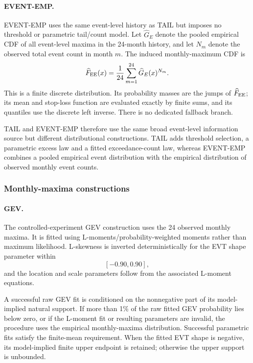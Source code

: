\documentclass[AMA,Times1COL]{WileyNJDv5}
\begin{document}
\paragraph*{EVENT-EMP.}

EVENT-EMP uses the same event-level history as TAIL but imposes no
threshold or parametric tail/count model. Let \(\widehat G_E\) denote
the pooled empirical CDF of all event-level maxima in the 24-month
history, and let \(N_m\) denote the observed total event count in
month \(m\). The induced monthly-maximum CDF is
\[
\widehat F_{\rm EE}(x)
=
\frac{1}{24}
\sum_{m=1}^{24}
\widehat G_E(x)^{N_m}.
\]
This is a finite discrete distribution. Its probability masses are the
jumps of \(\widehat F_{\rm EE}\); its mean and stop-loss function are
evaluated exactly by finite sums, and its quantiles use the discrete
left inverse. There is no dedicated fallback branch.

TAIL and EVENT-EMP therefore use the same broad event-level
information source but different distributional constructions. TAIL
adds threshold selection, a parametric excess law and a fitted
exceedance-count law, whereas EVENT-EMP combines a pooled empirical
event distribution with the empirical distribution of observed
monthly event counts.


\subsubsection*{Monthly-maxima constructions}

\paragraph*{GEV.}

The controlled-experiment GEV construction uses the 24 observed
monthly maxima. It is fitted using L-moments/probability-weighted
moments rather than maximum likelihood. L-skewness is inverted
deterministically for the EVT shape parameter within
\[
[-0.90,0.90],
\]
and the location and scale parameters follow from the associated
L-moment equations.

A successful raw GEV fit is conditioned on the nonnegative part of its
model-implied natural support. If more than 1\% of the raw fitted GEV
probability lies below zero, or if the L-moment fit or resulting
parameters are invalid, the procedure uses the empirical
monthly-maxima distribution. Successful parametric fits satisfy the
finite-mean requirement. When the fitted EVT shape is negative, its
model-implied finite upper endpoint is retained; otherwise the upper
support is unbounded.
\end{document}
